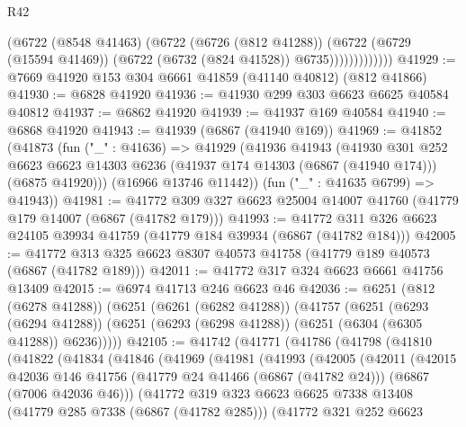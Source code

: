 \begin{lexlean}{R42}
\begin{coremodule}
{                      (@6722
                        (@8548 @41463)
                        (@6722
                          (@6726 (@812 @41288))
                          (@6722
                            (@6729 (@15594 @41469))
                            (@6722 (@6732 (@824 @41528)) @6735)))))))))))))
@41929 := @7669 @41920 @153 @304 @6661 @41859 (@41140 @40812) (@812 @41866)
@41930 := @6828 @41920
@41936 := @41930 @299 @303 @6623 @6625 @40584 @40812
@41937 := @6862 @41920
@41939 := @41937 @169 @40584
@41940 := @6868 @41920
@41943 := @41939 (@6867 (@41940 @169))
@41969 := @41852
    (@41873
      (fun ("_" : @41636) =>
      @41929
        (@41936
          @41943
          (@41930
            @301
            @252
            @6623
            @6623
            @14303
            @6236
            (@41937 @174 @14303 (@6867 (@41940 @174)))
            (@6875 @41920)))
        (@16966 @13746 @11442))
      (fun ("_" : @41635 @6799) => @41943))
@41981 := @41772 @309 @327 @6623 @25004 @14007 @41760 (@41779 @179 @14007 (@6867 (@41782 @179)))
@41993 := @41772 @311 @326 @6623 @24105 @39934 @41759 (@41779 @184 @39934 (@6867 (@41782 @184)))
@42005 := @41772 @313 @325 @6623 @8307 @40573 @41758 (@41779 @189 @40573 (@6867 (@41782 @189)))
@42011 := @41772 @317 @324 @6623 @6661 @41756 @13409
@42015 := @6974 @41713 @246 @6623 @46
@42036 := @6251
    (@812 (@6278 @41288))
    (@6251
      (@6261 (@6282 @41288))
      (@41757
        (@6251
          (@6293 (@6294 @41288))
          (@6251 (@6293 (@6298 @41288)) (@6251 (@6304 (@6305 @41288)) @6236)))))
@42105 := @41742
    (@41771
      (@41786
        (@41798
          (@41810
            (@41822
              (@41834
                (@41846
                  (@41969
                    (@41981
                      (@41993
                        (@42005
                          (@42011
                            (@42015
                              @42036
                              @146
                              @41756
                              (@41779 @24 @41466 (@6867 (@41782 @24)))
                              (@6867 (@7006 @42036 @46)))
                            (@41772
                              @319
                              @323
                              @6623
                              @6625
                              @7338
                              @13408
                              (@41779 @285 @7338 (@6867 (@41782 @285)))
                              (@41772
                                @321
                                @252
                                @6623
}
\end{coremodule}
\end{lexlean}
